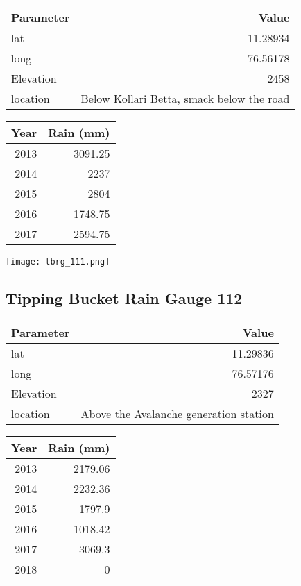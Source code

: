 \documentclass[a4paper]{article}
\begin{document}
\begin{center}
\begin{tabular}{lr}
Parameter & Value\\
\hline
lat & 11.28934\\
long & 76.56178\\
Elevation & 2458\\
location & Below Kollari Betta, smack below the road\\
\end{tabular}
\end{center}

\begin{center}
\begin{tabular}{rr}
Year & Rain (mm)\\
\hline
2013 & 3091.25\\
2014 & 2237\\
2015 & 2804\\
2016 & 1748.75\\
2017 & 2594.75\\
\end{tabular}
\end{center}

\begin{center}
\texttt{[image: tbrg\_111.png]}
\end{center}


\newpage

\subsection*{Tipping Bucket Rain Gauge 112}
\label{sec:org0646120}

\begin{center}
\begin{tabular}{lr}
Parameter & Value\\
\hline
lat & 11.29836\\
long & 76.57176\\
Elevation & 2327\\
location & Above the Avalanche generation station\\
\end{tabular}
\end{center}

\begin{center}
\begin{tabular}{rr}
Year & Rain (mm)\\
\hline
2013 & 2179.06\\
2014 & 2232.36\\
2015 & 1797.9\\
2016 & 1018.42\\
2017 & 3069.3\\
2018 & 0\\
\end{tabular}
\end{center}
\end{document}
